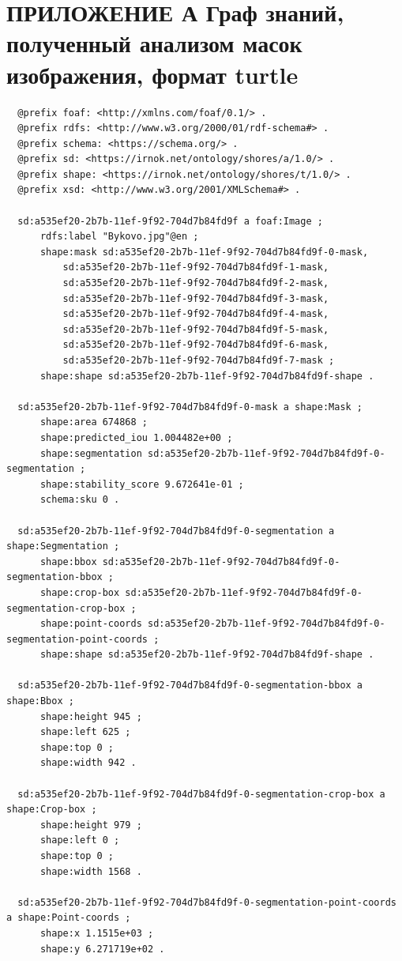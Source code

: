 \documentclass[732,fontsize=14pt,final]{studrep}
\begin{document}
\chapter*{ПРИЛОЖЕНИЕ А Граф знаний, полученный анализом масок изображения, формат turtle}
\begin{verbatim}
  @prefix foaf: <http://xmlns.com/foaf/0.1/> .
  @prefix rdfs: <http://www.w3.org/2000/01/rdf-schema#> .
  @prefix schema: <https://schema.org/> .
  @prefix sd: <https://irnok.net/ontology/shores/a/1.0/> .
  @prefix shape: <https://irnok.net/ontology/shores/t/1.0/> .
  @prefix xsd: <http://www.w3.org/2001/XMLSchema#> .
  
  sd:a535ef20-2b7b-11ef-9f92-704d7b84fd9f a foaf:Image ;
      rdfs:label "Bykovo.jpg"@en ;
      shape:mask sd:a535ef20-2b7b-11ef-9f92-704d7b84fd9f-0-mask,
          sd:a535ef20-2b7b-11ef-9f92-704d7b84fd9f-1-mask,
          sd:a535ef20-2b7b-11ef-9f92-704d7b84fd9f-2-mask,
          sd:a535ef20-2b7b-11ef-9f92-704d7b84fd9f-3-mask,
          sd:a535ef20-2b7b-11ef-9f92-704d7b84fd9f-4-mask,
          sd:a535ef20-2b7b-11ef-9f92-704d7b84fd9f-5-mask,
          sd:a535ef20-2b7b-11ef-9f92-704d7b84fd9f-6-mask,
          sd:a535ef20-2b7b-11ef-9f92-704d7b84fd9f-7-mask ;
      shape:shape sd:a535ef20-2b7b-11ef-9f92-704d7b84fd9f-shape .
  
  sd:a535ef20-2b7b-11ef-9f92-704d7b84fd9f-0-mask a shape:Mask ;
      shape:area 674868 ;
      shape:predicted_iou 1.004482e+00 ;
      shape:segmentation sd:a535ef20-2b7b-11ef-9f92-704d7b84fd9f-0-segmentation ;
      shape:stability_score 9.672641e-01 ;
      schema:sku 0 .
  
  sd:a535ef20-2b7b-11ef-9f92-704d7b84fd9f-0-segmentation a shape:Segmentation ;
      shape:bbox sd:a535ef20-2b7b-11ef-9f92-704d7b84fd9f-0-segmentation-bbox ;
      shape:crop-box sd:a535ef20-2b7b-11ef-9f92-704d7b84fd9f-0-segmentation-crop-box ;
      shape:point-coords sd:a535ef20-2b7b-11ef-9f92-704d7b84fd9f-0-segmentation-point-coords ;
      shape:shape sd:a535ef20-2b7b-11ef-9f92-704d7b84fd9f-shape .
  
  sd:a535ef20-2b7b-11ef-9f92-704d7b84fd9f-0-segmentation-bbox a shape:Bbox ;
      shape:height 945 ;
      shape:left 625 ;
      shape:top 0 ;
      shape:width 942 .
  
  sd:a535ef20-2b7b-11ef-9f92-704d7b84fd9f-0-segmentation-crop-box a shape:Crop-box ;
      shape:height 979 ;
      shape:left 0 ;
      shape:top 0 ;
      shape:width 1568 .
  
  sd:a535ef20-2b7b-11ef-9f92-704d7b84fd9f-0-segmentation-point-coords a shape:Point-coords ;
      shape:x 1.1515e+03 ;
      shape:y 6.271719e+02 .
  

\end{verbatim}
\end{document}
